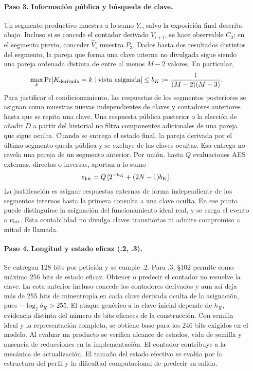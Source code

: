 \documentclass[11pt,a4paper]{article}
\begin{document}
\paragraph{Paso 3. Información pública y búsqueda de clave.}
Un segmento productivo muestra a lo sumo \(Y_i\), salvo la
exposición final descrita abajo. Incluso si se concede el
contador derivado \(V_{i+1}\), se hace observable \(C_3\);
en el segmento previo, conceder \(\widehat V_i\) muestra \(P_3\).
Dados hasta dos resultados distintos del segmento, la
pareja que forma una clave interna no divulgada sigue
siendo una pareja ordenada distinta de entre al menos
\(M-2\) valores. En particular,
\[
   \max_k\Pr[K_{\rm derivada}=k\mid\text{vista asignada}]
       \le b_K:=\frac{1}{(M-2)(M-3)}.
\]
Para justificar el condicionamiento, las respuestas de
los segmentos posteriores se asignan como muestras nuevas
independientes de claves y contadores anteriores hasta
que se repita una clave. Una respuesta pública posterior
o la elección de añadir \(D\) a partir del historial no
filtra componentes adicionales de una pareja que sigue
oculta. Cuando se entrega el estado final, la pareja
derivada por el último segmento queda pública y se
excluye de las claves ocultas. Esa entrega no revela una
pareja de un segmento anterior. Por unión, hasta \(Q\)
evaluaciones AES externas, directas o inversas, aportan
a lo sumo
\[
    e_{\rm hit}=Q\,[2^{-h_K}+(2N-1)b_K].
\]
La justificación es asignar respuestas externas de forma
independiente de los segmentos internos hasta la primera
consulta a una clave oculta. En ese punto puede distinguirse
la asignación del funcionamiento ideal real, y se carga
el evento a \(e_{\rm hit}\). Esta contabilidad no divulga
claves transitorias ni admite compromiso a mitad de llamada.

\paragraph{Paso 4. Longitud y estado eficaz (.2, .3).}
Se entregan 128 bits por petición y se cumple .2.
Para .3, §102 permite como máximo 256 bits de estado
eficaz. Obtener o predecir el contador no resuelve la
clave. La cota anterior incluso concede los contadores
derivados y aun así deja más de 255 bits de minentropía
en cada clave derivada oculta de la asignación,
pues \(-\log_2 b_K>255\). El ataque genérico a la
clave inicial depende de \(h_K\), evidencia distinta
del número de bits eficaces de la construcción.
Con semilla ideal y la representación completa,
se obtiene base para los 246 bits exigidos en el modelo.
Al evaluar un producto se verifica alcance de estados,
vida de semilla y ausencia de reducciones en la
implementación. El contador contribuye a la mecánica de actualización. El tamaño del estado efectivo se evalúa por la estructura del perfil y la dificultad computacional de predecir su salida.
\end{document}
